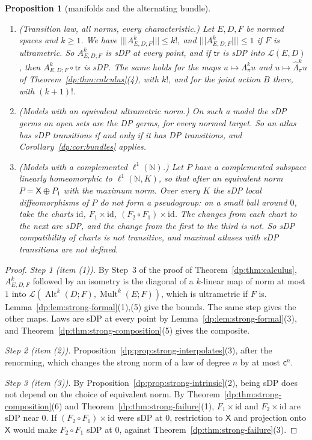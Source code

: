 \documentclass[11pt]{amsart}
\newtheorem{proposition}[theorem]{Proposition}
\theoremstyle{definition}
\theoremstyle{remark}
\numberwithin{equation}{section}
\newcommand{\N}{\mathbb N}
\newcommand{\cL}{\mathcal L}
\newcommand{\Alt}{\operatorname{Alt}}
\newcommand{\Mult}{\operatorname{Mult}}
\newcommand{\id}{\mathrm{id}}
\theoremstyle{plain}
\theoremstyle{definition}
\theoremstyle{plain}
\begin{document}
\begin{proposition}[manifolds and the alternating bundle]\label{dp:prop:strong-bundle}
\leavevmode
\begin{enumerate}
\item \textup{(Transition law, all norms, every characteristic.)} Let $E,D,F$ be normed spaces and $k\ge1$. We have $\lvert\!\lvert\!\lvert A^k_{E,D;F}\rvert\!\rvert\!\rvert\le k!$, and $\lvert\!\lvert\!\lvert A^k_{E,D;F}\rvert\!\rvert\!\rvert\le1$ if $F$ is ultrametric. So $A^k_{E,D;F}$ is sDP at every point, and if $\mathsf{tr}$ is sDP into $\cL(E,D)$, then $A^k_{E,D;F}\circ\mathsf{tr}$ is sDP. The same holds for the maps $u\mapsto\Lambda^k_\pi u$ and $u\mapsto\widehat\Lambda^k_\pi u$ of Theorem~\ref{dp:thm:calculus}(4), with $k!$, and for the joint action $B$ there, with $(k+1)!$.
\item \textup{(Models with an equivalent ultrametric norm.)} On such a model the sDP germs on open sets are the DP germs, for every normed target. So an atlas has sDP transitions if and only if it has DP transitions, and Corollary~\ref{dp:cor:bundles} applies.
\item \textup{(Models with a complemented $\ell^1(\N)$.)} Let $P$ have a complemented subspace linearly homeomorphic to $\ell^1(\N,K)$, so that after an equivalent norm $P=\mathsf X\oplus P_1$ with the maximum norm. Over every $K$ the sDP local diffeomorphisms of $P$ do not form a pseudogroup: on a small ball around $0$, take the charts $\id$, $F_1\times\id$, $(F_2\circ F_1)\times\id$. The changes from each chart to the next are sDP, and the change from the first to the third is not. So sDP compatibility of charts is not transitive, and maximal atlases with sDP transitions are not defined.
\end{enumerate}
\end{proposition}

\begin{proof}
\emph{Step 1 (item (1)).} By Step~3 of the proof of Theorem~\ref{dp:thm:calculus}, $A^k_{E,D;F}$ followed by an isometry is the diagonal of a $k$\nobreakdash-linear map of norm at most $1$ into $\cL(\Alt^k(D;F),\Mult^k(E;F))$, which is ultrametric if $F$ is. Lemma~\ref{dp:lem:strong-formal}(1),(5) give the bounds. The same step gives the other maps. Laws are sDP at every point by Lemma~\ref{dp:lem:strong-formal}(3), and Theorem~\ref{dp:thm:strong-composition}(5) gives the composite.

\emph{Step 2 (item (2)).} Proposition~\ref{dp:prop:strong-interpolates}(3), after the renorming, which changes the strong norm of a law of degree $n$ by at most $\mathsf c^n$.

\emph{Step 3 (item (3)).} By Proposition~\ref{dp:prop:strong-intrinsic}(2), being sDP does not depend on the choice of equivalent norm. By Theorem~\ref{dp:thm:strong-composition}(6) and Theorem~\ref{dp:thm:strong-failure}(1), $F_1\times\id$ and $F_2\times\id$ are sDP near $0$. If $(F_2\circ F_1)\times\id$ were sDP at $0$, restriction to $\mathsf X$ and projection onto $\mathsf X$ would make $F_2\circ F_1$ sDP at $0$, against Theorem~\ref{dp:thm:strong-failure}(3).
\end{proof}
\end{document}
